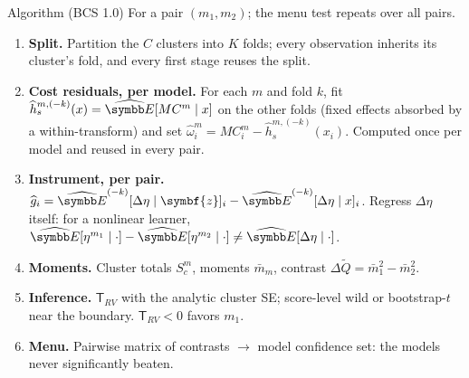 \documentclass[aspectratio=169,10pt]{beamer}
\begin{document}
\begin{frame}{Algorithm (BCS 1.0)}
\small
For a pair $(m_1, m_2)$; the menu test repeats over all pairs.
\begin{enumerate}
\item \textbf{Split.} Partition the $C$ clusters into $K$ folds; every observation inherits its cluster's fold, and every first stage reuses the split.
\item \textbf{Cost residuals, per model.} For each $m$ and fold $k$, fit $\widehat h_s^{m,(-k)}(x) = \widehat{\E}[MC^m \mid x]$ on the other folds (fixed effects absorbed by a within-transform) and set $\widehat\omega^m_i = MC^m_i - \widehat h_s^{m,(-k)}(x_i)$. Computed once per model and reused in every pair.
\item \textbf{Instrument, per pair.} $\widehat g_i = \widehat{\E}^{(-k)}[\Delta\eta \mid \symbf{z}]_i - \widehat{\E}^{(-k)}[\Delta\eta \mid x]_i$. Regress $\Delta\eta$ itself: for a nonlinear learner, $\widehat{\E}[\eta^{m_1} \mid \cdot] - \widehat{\E}[\eta^{m_2} \mid \cdot] \neq \widehat{\E}[\Delta\eta \mid \cdot]$.
\item \textbf{Moments.} Cluster totals $S^m_c$, moments $\bar m_m$, contrast $\Delta\widetilde Q = \bar m_1^2 - \bar m_2^2$.
\item \textbf{Inference.} $\mathsf{T}_{RV}$ with the analytic cluster SE; score-level wild or bootstrap-$t$ near the boundary. $\mathsf{T}_{RV} < 0$ favors $m_1$.
\item \textbf{Menu.} Pairwise matrix of contrasts $\rightarrow$ model confidence set: the models never significantly beaten.
\end{enumerate}
\end{frame}
\end{document}
